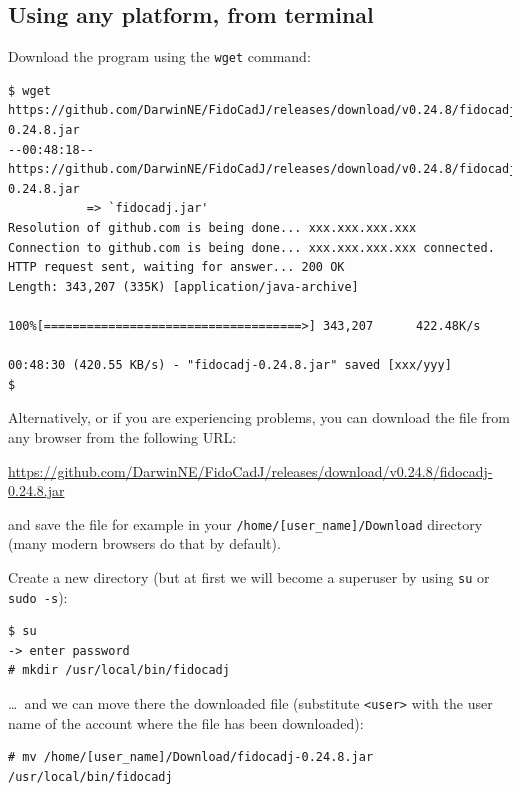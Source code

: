 \documentclass[10pt,a4paper,twoside]{scrreprt}
\begin{document}
\subsection{Using any platform, from terminal}

\label{inst_testo} Download the program using the \lstinline!wget! command:



\begin{lstlisting}
$ wget https://github.com/DarwinNE/FidoCadJ/releases/download/v0.24.8/fidocadj-0.24.8.jar
--00:48:18--  https://github.com/DarwinNE/FidoCadJ/releases/download/v0.24.8/fidocadj-0.24.8.jar
           => `fidocadj.jar'
Resolution of github.com is being done... xxx.xxx.xxx.xxx
Connection to github.com is being done... xxx.xxx.xxx.xxx connected.
HTTP request sent, waiting for answer... 200 OK
Length: 343,207 (335K) [application/java-archive]

100%[====================================>] 343,207      422.48K/s

00:48:30 (420.55 KB/s) - "fidocadj-0.24.8.jar" saved [xxx/yyy]
$
\end{lstlisting}
\lstset{
    basicstyle=\small\ttfamily}

Alternatively, or if you are experiencing problems, you can download the file from any browser from the following URL:

{\small
\href{https://github.com/DarwinNE/FidoCadJ/releases/download/v0.24.8/fidocadj-0.24.8.jar}{https://github.com/DarwinNE/FidoCadJ/releases/download/v0.24.8/fidocadj-0.24.8.jar}}

and save the file for example in your \lstinline!/home/[user_name]/Download! directory (many modern browsers do that by default).

Create a new directory (but at first we will become a superuser by using \lstinline!su! or \lstinline!sudo -s!):

\begin{lstlisting}
$ su
-> enter password
# mkdir /usr/local/bin/fidocadj
\end{lstlisting}

\dots\ and we can move there the downloaded file (substitute \lstinline!<user>! with the user name of the account where the file has been downloaded):

\begin{lstlisting}
# mv /home/[user_name]/Download/fidocadj-0.24.8.jar /usr/local/bin/fidocadj
\end{lstlisting}
\end{document}
